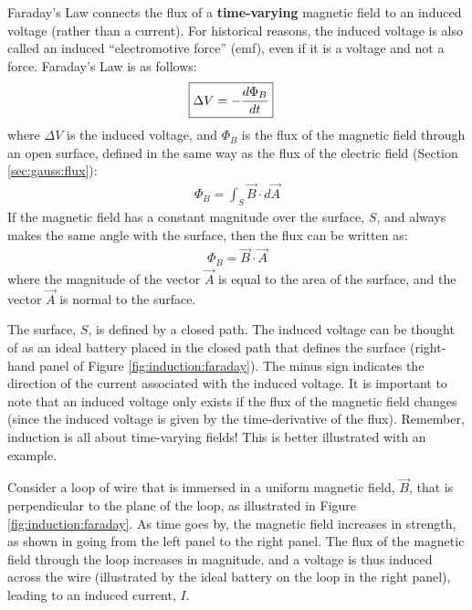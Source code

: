 Faraday's Law connects the flux of a \textbf{time-varying} magnetic field to an induced voltage (rather than a current). For historical reasons, the induced voltage is also called an induced ``electromotive force'' (emf), even if it is a voltage and not a force. Faraday's Law is as follows:
\begin{align*}
\Aboxed{\Delta V = -\frac{d\Phi_B}{dt}}
\end{align*}
where $\Delta V$ is the induced voltage, and  $\Phi_B$ is the flux of the magnetic field through an open surface, defined in the same way as the flux of the electric field (Section \ref{sec:gauss:flux}):
\begin{align*}
\Phi_B = \int_S \vec B\cdot d\vec A
\end{align*}
If the magnetic field has a constant magnitude over the surface, $S$, and always makes the same angle with the surface, then the flux can be written as:
\begin{align*}
\Phi_B =  \vec B\cdot\vec A
\end{align*}
where the magnitude of the vector $\vec A$ is equal to the area of the surface, and the vector $\vec A$ is normal to the surface.

The surface, $S$, is defined by a closed path. The induced voltage can be thought of as an ideal battery placed in the closed path that defines the surface (right-hand panel of Figure \ref{fig:induction:faraday}). The minus sign indicates the direction of the current associated with the induced voltage. It is important to note that an induced voltage only exists if the flux of the magnetic field changes (since the induced voltage is given by the time-derivative of the flux). Remember, induction is all about time-varying fields! This is better illustrated with an example.

Consider a loop of wire that is immersed in a uniform magnetic field, $\vec B$, that is perpendicular to the plane of the loop, as illustrated in Figure \ref{fig:induction:faraday}. As time goes by, the magnetic field increases in strength, as shown in going from the left panel to the right panel. The flux of the magnetic field through the loop increases in magnitude, and a voltage is thus induced across the wire (illustrated by the ideal battery on the loop in the right panel), leading to an induced current, $I$.

